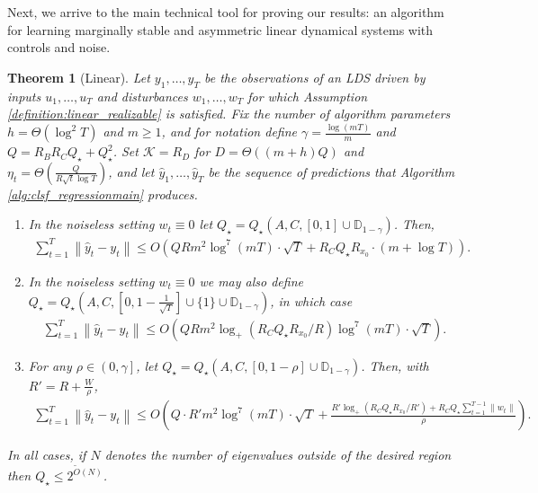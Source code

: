 \documentclass[11pt]{article}
\newcommand{\norm}[1]{\left\lVert#1\right\rVert}
\newtheorem{theorem}{Theorem}[section]
\numberwithin{equation}{section}
\begin{document}
Next, we arrive to the main technical tool for proving our results: an algorithm for learning marginally stable and asymmetric linear dynamical systems with controls and noise.


\begin{theorem}[Linear]
\label{theorem:main_linear}
Let $y_1, \ldots, y_T$ be the observations of an LDS driven by inputs $u_1, \ldots, u_T$ and disturbances $w_1, \ldots, w_T$ for which Assumption \ref{definition:linear_realizable} is satisfied. Fix the number of algorithm parameters $h = \Theta(\log^2T)$ and $m \geq 1$, and for notation define $\gamma = \frac{\log(mT)}{m}$ and $Q = R_BR_CQ_\star + Q_\star^2$. Set $\mathcal{K} = R_D$ for $D = \Theta\left((m+h) Q\right)$ and $\eta_t = \Theta\left(\frac{Q}{R \sqrt{t}\log T }\right)$, and let $\hat{y}_1, \ldots, \hat{y}_T$ be the sequence of predictions that Algorithm \ref{alg:clsf_regressionmain} produces. 
\begin{enumerate}
\item[(a).] In the noiseless setting $w_t \equiv 0$ let $Q_\star = Q_\star\left(A, C, [0, 1] \cup \mathbb{D}_{1-\gamma}\right)$. Then,
    \begin{align*}
        \sum_{t=1}^T \norm{\hat{y}_t - y_t} \leq O\left(Q R m^2 \log^7(mT) \cdot \sqrt{T} + R_C Q_\star R_{x_0 } \cdot (m + \log T)\right).
    \end{align*}
    
    \item[(b).] In the noiseless setting $w_t \equiv 0$ we may also define $Q_\star = Q_\star\left(A, C, \left[0, 1-\frac{1}{\sqrt{T}}\right] \cup \{1\} \cup \mathbb{D}_{1-\gamma} \right)$, in which case
        \begin{align*}
        \sum_{t=1}^T \norm{\hat{y}_t - y_t} \leq O\left(Q R m^2 \log_+(R_C Q_\star R_{x_0} / R)\log^7(mT) \cdot \sqrt{T}\right).
    \end{align*}

    \item[(c).] For any $\rho \in \left(0, \gamma\right]$, let $Q_\star = Q_\star(A, C, [0, 1-\rho] \cup \mathbb{D}_{1-\gamma})$. Then, with $R' = R + \frac{W}{\rho
    }$,
    \begin{align*}
        \sum_{t=1}^T \norm{\hat{y}_t - y_t} \leq O\left(Q \cdot R' m^2 \log^7(mT) \cdot \sqrt{T} + \frac{R' \log_+(R_C Q_\star R_{x_0} / R') + R_C Q_\star \sum_{t=1}^{T-1}\|w_t\|}{\rho}\right).
    \end{align*}
    
\end{enumerate}
In all cases, if $N$ denotes the number of eigenvalues outside of the desired region then $Q_\star \leq 2^{\widetilde{O}(N)}$. 
\end{theorem}
\end{document}
